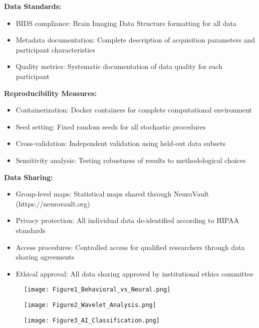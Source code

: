 \documentclass[12pt, a4paper]{article}
\begin{document}
\noindent
\textbf{Data Standards:}
\begin{itemize}
\item BIDS compliance: Brain Imaging Data Structure formatting for all data
\item Metadata documentation: Complete description of acquisition parameters and participant characteristics
\item Quality metrics: Systematic documentation of data quality for each participant
\end{itemize}

\noindent
\textbf{Reproducibility Measures:}
\begin{itemize}
\item Containerization: Docker containers for complete computational environment
\item Seed setting: Fixed random seeds for all stochastic procedures
\item Cross-validation: Independent validation using held-out data subsets
\item Sensitivity analysis: Testing robustness of results to methodological choices
\end{itemize}

\noindent
\textbf{Data Sharing:}
\begin{itemize}
\item Group-level maps: Statistical maps shared through NeuroVault (https://neurovault.org)
\item Privacy protection: All individual data de-identified according to HIPAA standards
\item Access procedures: Controlled access for qualified researchers through data sharing agreements
\item Ethical approval: All data sharing approved by institutional ethics committee
\end{itemize}



\begin{figure}[H]
\texttt{[image: Figure1\_Behavioral\_vs\_Neural.png]}
\end{figure}

\begin{figure}[H]
\texttt{[image: Figure2\_Wavelet\_Analysis.png]}
\end{figure}

\begin{figure}[H]
\texttt{[image: Figure3\_AI\_Classification.png]}
\end{figure}
\end{document}
